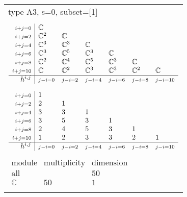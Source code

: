 \documentclass[crop,border=2mm]{standalone}
\begin{document}
\begin{tabular}{l}
{\huge type A3, s=0, subset=[1]}\\ \\


$\displaystyle
\begin{array}{r|l l l l l l}
	{\scriptstyle i+j=0}&\mathbb{C}&&&&&\\
	{\scriptstyle i+j=2}&\mathbb{C}^{2}&\mathbb{C}&&&&\\
	{\scriptstyle i+j=4}&\mathbb{C}^{3}&\mathbb{C}^{3}&\mathbb{C}&&&\\
	{\scriptstyle i+j=6}&\mathbb{C}^{3}&\mathbb{C}^{5}&\mathbb{C}^{3}&\mathbb{C}&&\\
	{\scriptstyle i+j=8}&\mathbb{C}^{2}&\mathbb{C}^{4}&\mathbb{C}^{5}&\mathbb{C}^{3}&\mathbb{C}&\\
	{\scriptstyle i+j=10}&\mathbb{C}&\mathbb{C}^{2}&\mathbb{C}^{3}&\mathbb{C}^{3}&\mathbb{C}^{2}&\mathbb{C}\\
	\hline h^{i,j}&{\scriptstyle j-i=0}&{\scriptstyle j-i=2}&{\scriptstyle j-i=4}&{\scriptstyle j-i=6}&{\scriptstyle j-i=8}&{\scriptstyle j-i=10}
\end{array}
$ \\ \\


$\displaystyle
\begin{array}{r|l l l l l l}
	{\scriptstyle i+j=0}&1&&&&&\\
	{\scriptstyle i+j=2}&2&1&&&&\\
	{\scriptstyle i+j=4}&3&3&1&&&\\
	{\scriptstyle i+j=6}&3&5&3&1&&\\
	{\scriptstyle i+j=8}&2&4&5&3&1&\\
	{\scriptstyle i+j=10}&1&2&3&3&2&1\\
	\hline h^{i,j}&{\scriptstyle j-i=0}&{\scriptstyle j-i=2}&{\scriptstyle j-i=4}&{\scriptstyle j-i=6}&{\scriptstyle j-i=8}&{\scriptstyle j-i=10}
\end{array}
$ \\ \\


$\displaystyle
\begin{array}{rll}
	\text{module}&\text{multiplicity}&\text{dimension} \\ \hline \text{all}&&50 \\
	\mathbb{C}&50&1
\end{array}
$ \\ \\

\end{tabular}
\end{document}

